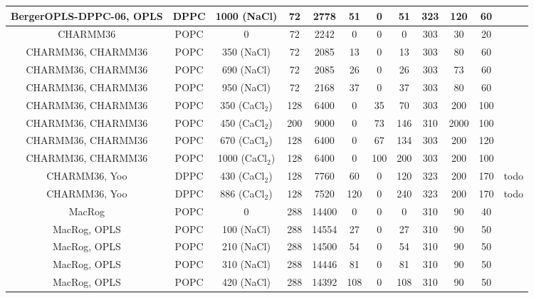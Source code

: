 \documentclass[twoside,twocolumn,9pt]{article}
\begin{document}
\begin{table}
\begin{tabular}{c c c c c c c c c c c c}
  BergerOPLS-DPPC-06\cite{tieleman06}, OPLS\cite{aqvist90} &   DPPC & 1000 (NaCl) & 72 & 2778 & 51  & 0  & 51 &323  & 120 & 60 &\cite{bergerOPLSDPPCfiles1000mMnacl} \\
  \hline
  CHARMM36\cite{klauda10}   & POPC & 0           & 72 & 2242 & 0  & 0 & 0 & 303  & 30 & 20 & \cite{charmm36filesSHORT} \\
  CHARMM36\cite{klauda10}, CHARMM36\cite{venable13} & POPC & 350 (NaCl)  & 72 & 2085 & 13  & 0 & 13 & 303  & 80 & 60 & \cite{charmmPOPC350mMNaClfiles} \\
  CHARMM36\cite{klauda10}, CHARMM36\cite{venable13} & POPC & 690 (NaCl)  & 72 & 2085 & 26  & 0 & 26 & 303  & 73 & 60 & \cite{charmmPOPC690mMNaClfiles}   \\
  CHARMM36\cite{klauda10}, CHARMM36\cite{venable13}  & POPC & 950 (NaCl)  & 72 & 2168 & 37  & 0 & 37 & 303  & 80 & 60 &\cite{charmmPOPC950mMNaClfiles}  \\
  CHARMM36\cite{klauda10}, CHARMM36 & POPC &  350 (CaCl$_2$)  & 128 & 6400 & 0& 35 & 70 & 303  & 200  & 100 & \cite{charmmPOPC350mMCaClfiles}  \\
  CHARMM36\cite{klauda10}, CHARMM36 & POPC &  450 (CaCl$_2$)  & 200 & 9000 & 0& 73 & 146 & 310  & 2000  & 100 & \cite{charmmPOPC450mMCaClfiles}  \\
  CHARMM36\cite{klauda10}, CHARMM36 & POPC &  670 (CaCl$_2$)  & 128 & 6400 & 0& 67 & 134 & 303  & 200  & 120 & \cite{charmmPOPC670mMCaClfiles}  \\  
  CHARMM36\cite{klauda10}, CHARMM36 & POPC &  1000 (CaCl$_2$) & 128 & 6400 & 0& 100 & 200 & 303 & 200  & 100 & \cite{charmmPOPC1000mMCaClfiles}  \\
  \hline
  CHARMM36\cite{klauda10}, Yoo\cite{yoo16}  & DPPC & 430 (CaCl$_2$)  & 128 & 7760 & 60  & 0 & 120 & 323  & 200 & 170 &todo  \\
  CHARMM36\cite{klauda10}, Yoo\cite{yoo16}  & DPPC & 886 (CaCl$_2$)  & 128 & 7520 & 120  & 0 & 240 & 323  & 200 & 170 &todo  \\
  \hline
  MacRog\cite{maciejewski14}  & POPC & 0 & 288 & 14400 & 0 & 0 & 0 & 310 & 90&40  &~\cite{macrogdehydFILES}  \\
  MacRog\cite{maciejewski14}, OPLS\cite{aqvist90}  & POPC & 100 (NaCl) & 288 & 14554 & 27 & 0 & 27 & 310 & 90&50  & \cite{macrogIONfiles} \\
  MacRog\cite{maciejewski14}, OPLS\cite{aqvist90}  & POPC &  210 (NaCl) & 288 & 14500 & 54 & 0 & 54 & 310 & 90&50  &\cite{macrogIONfiles}  \\
  MacRog\cite{maciejewski14}, OPLS\cite{aqvist90}  & POPC &   310 (NaCl) & 288 & 14446 & 81 & 0 & 81 & 310 & 90&50  & \cite{macrogIONfiles} \\
  MacRog\cite{maciejewski14}, OPLS\cite{aqvist90}  & POPC &   420 (NaCl) & 288 & 14392 & 108 & 0 & 108 & 310 & 90& 50  & \cite{macrogIONfiles}  \\
\end{tabular}
\end{table} 
\end{document}
